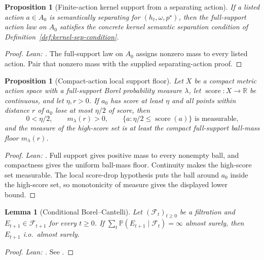 \documentclass[11pt]{article}
\newtheorem{proposition}[theorem]{Proposition}
\newtheorem{lemma}[theorem]{Lemma}
\theoremstyle{definition}
\theoremstyle{remark}
\theoremstyle{plain}
\theoremstyle{definition}
\newcommand{\Prob}{\mathbb{P}}
\begin{document}
\begin{proposition}[Finite-action kernel support from a separating action]
\label{prop:finite-action-kernel-separation}
If a listed action $a\in A_0$ is semantically separating for $(h_t,\omega,p^\star)$, then the full-support action law on $A_0$ satisfies the concrete kernel semantic separation condition of Definition~\ref{def:kernel-sep-condition}.
\end{proposition}

\begin{proof}
\noindent\emph{Lean: .}
The full-support law on $A_0$ assigns nonzero mass to every listed action. Pair that nonzero mass with the supplied separating-action proof.
\end{proof}

\begin{proposition}[Compact-action local support floor]
\label{prop:compact-action-kernel-separation}
Let $X$ be a compact metric action space with a full-support Borel probability measure $\lambda$, let $\operatorname{score}:X\to\mathbb R$ be continuous, and let $\eta,r>0$. If $a_0$ has score at least $\eta$ and all points within distance $r$ of $a_0$ lose at most $\eta/2$ of score, then
\[
0<\eta/2,\qquad
m_\lambda(r)>0,\qquad
\{a:\eta/2\le \operatorname{score}(a)\}\text{ is measurable,}
\]
and the measure of the high-score set is at least the compact full-support ball-mass floor $m_\lambda(r)$.
\end{proposition}

\begin{proof}
\noindent\emph{Lean: .}
Full support gives positive mass to every nonempty ball, and compactness gives the uniform ball-mass floor. Continuity makes the high-score set measurable. The local score-drop hypothesis puts the ball around $a_0$ inside the high-score set, so monotonicity of measure gives the displayed lower bound.
\end{proof}

\begin{lemma}[Conditional Borel--Cantelli]
\label{lem:conditional-bc}
Let $(\mathcal{F}_t)_{t\ge 0}$ be a filtration and $E_{t+1}\in\mathcal{F}_{t+1}$ for every $t\ge 0$. If $\sum_t\Prob(E_{t+1}\mid\mathcal{F}_t)=\infty$ almost surely, then $E_{t+1}$ i.o.\ almost surely.
\end{lemma}

\begin{proof}
\noindent\emph{Lean: .}
See \citet[Chapter~12]{Williams1991}.
\end{proof}
\end{document}
